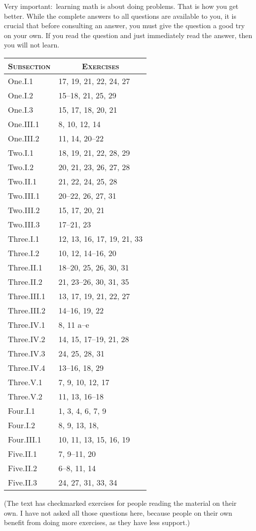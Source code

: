 \documentclass{article}
\begin{document}
Very important:~learning math is about doing problems.
That is how you get better.
While the complete answers to all questions are available to you,
it is crucial that before consulting an answer, you must give 
the question a good try on your own.
If you read the question and just immediately read the answer, then 
you will not learn.
\begin{center}\small
\begin{tabular}{l|l}
  \multicolumn{1}{c}{\textsc{Subsection}} &\multicolumn{1}{c}{\textsc{Exercises}} \\
  \hline
  One.I.1   &17, 19, 21, 22, 24, 27  \\
  One.I.2   &15--18, 21, 25, 29  \\
  One.I.3   &15, 17, 18, 20, 21  \\
  One.III.1 &8, 10, 12, 14  \\
  One.III.2 &11, 14, 20--22  \\[0.5ex]
  Two.I.1 &18, 19, 21, 22, 28, 29  \\
  Two.I.2 &20, 21, 23, 26, 27, 28  \\
  Two.II.1 &21, 22, 24, 25, 28  \\
  Two.III.1 &20--22, 26, 27, 31  \\
  Two.III.2 &15, 17, 20, 21   \\
  Two.III.3 &17--21, 23  \\[0.5ex]
  Three.I.1 &12, 13, 16, 17, 19, 21, 33  \\
  Three.I.2 &10, 12, 14--16, 20  \\
  Three.II.1 &18--20, 25, 26, 30, 31  \\
  Three.II.2 &21, 23--26, 30, 31, 35   \\
  Three.III.1 &13, 17, 19, 21, 22, 27  \\ 
  Three.III.2 &14--16, 19, 22     \\
  Three.IV.1 &8, 11 a--e   \\
  Three.IV.2 &14, 15, 17--19, 21, 28  \\
  Three.IV.3 &24, 25, 28, 31 \\
  Three.IV.4 &13--16, 18, 29 \\
  Three.V.1 &7, 9, 10, 12, 17  \\
  Three.V.2 &11, 13, 16--18          \\[0.5ex]
  Four.I.1 &1, 3, 4, 6, 7, 9  \\
  Four.I.2 &8, 9, 13, 18,  \\
  Four.III.1 &10, 11, 13, 15, 16, 19  \\[0.5ex]
  Five.II.1 &7, 9--11, 20 \\
  Five.II.2 &6--8, 11, 14  \\
  Five.II.3 &24, 27, 31, 33, 34  \\
\end{tabular}
\end{center}

\noindent 
(The text has checkmarked exercises for people reading the material on
their own.
I have not asked all those questions here, because
people on their own benefit from doing more 
exercises, as they have less support.)
\end{document}
